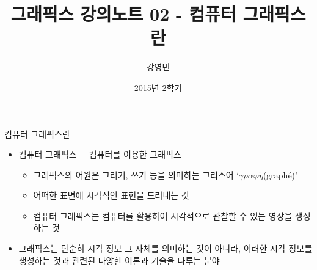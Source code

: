 \documentclass{beamer}
\title[3D 그래픽스 프로그래밍]{그래픽스 강의노트 02 - 컴퓨터 그래픽스란}
\author{강영민}
\institute{동명대학교}
\date{2015년 2학기}
\begin{document}
\begin{frame}
  \titlepage
\end{frame}



\begin{frame}{컴퓨터 그래픽스란}
\begin{itemize}
\item 컴퓨터 그래픽스 = 컴퓨터를 이용한 그래픽스
	\begin{itemize}
	\item 그래픽스의 어원은 그리기, 쓰기 등을 의미하는 그리스어  ‘$\gamma\rho\alpha\varphi\acute{\eta}$(graph\'{e})’
	\item 어떠한 표면에 시각적인 표현을 드러내는 것
	\item 컴퓨터 그래픽스는 컴퓨터를 활용하여 시각적으로 관찰할 수 있는 영상을 생성하는 것
	\end{itemize}
\item 그래픽스는 단순히 시각 정보 그 자체를 의미하는 것이 아니라, 이러한 시각 정보를 생성하는 것과 관련된 다양한 이론과 기술을 다루는 분야
\end{itemize}
\end{frame}
\end{document}
